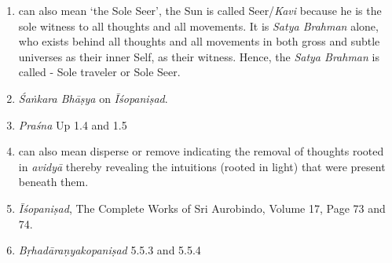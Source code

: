 \begin{enumerate}
\itemsep=0pt
\item
   can also mean `the Sole Seer', the Sun is called Seer/\emph{Kavi} because he is the sole witness to all thoughts and all movements. It is \emph{Satya Brahman} alone, who exists behind all thoughts and all movements in both gross and subtle universes as their inner Self, as their witness. Hence, the \emph{Satya Brahman} is called - Sole traveler or Sole Seer.
\item
  \emph{Śaṅkara Bhāṣya} on \emph{Īśopaniṣad}.
\item
  \emph{Praśna} Up 1.4 and 1.5
\item
   can also mean disperse or remove indicating the removal of thoughts rooted in \emph{avidyā} thereby revealing the intuitions (rooted in light) that were present beneath them.
\item
	\emph{Īśopaniṣad}, The Complete Works of Sri Aurobindo, Volume 17, Page 73 and 74.
\item
  \emph{Bṛhadāraṇyakopaniṣad} 5.5.3 and 5.5.4
\end{enumerate}


